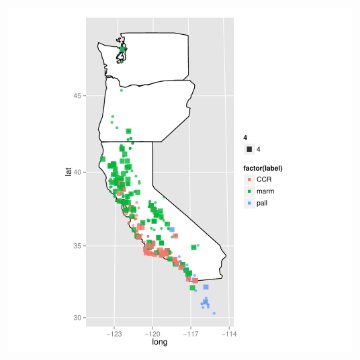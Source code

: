\documentclass{article}\usepackage{graphicx, color}
\begin{document}
\begin{figure}[t]
\begin{subfigure}[b]{0.5\textwidth}
    \includegraphics[width = \textwidth]{figure/rf-map2}
    \label{fig:rf-map2}
  \end{subfigure}\\


\end{figure}
\end{document}
